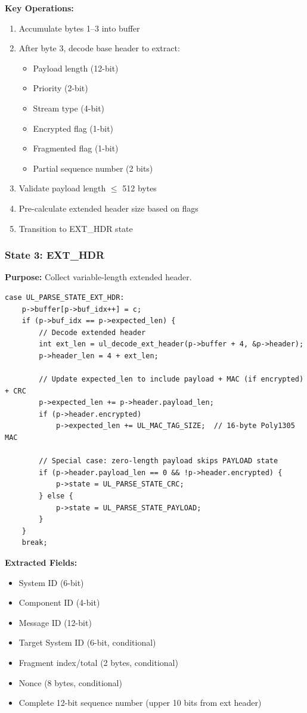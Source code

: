 \documentclass[11pt,a4paper]{article}
\begin{document}
\textbf{Key Operations:}
\begin{enumerate}[noitemsep]
    \item Accumulate bytes 1--3 into buffer
    \item After byte 3, decode base header to extract:
    \begin{itemize}
        \item Payload length (12-bit)
        \item Priority (2-bit)
        \item Stream type (4-bit)
        \item Encrypted flag (1-bit)
        \item Fragmented flag (1-bit)
        \item Partial sequence number (2 bits)
    \end{itemize}
    \item Validate payload length $\leq$ 512 bytes
    \item Pre-calculate extended header size based on flags
    \item Transition to EXT\_HDR state
\end{enumerate}

\subsubsection{State 3: EXT\_HDR}

\textbf{Purpose:} Collect variable-length extended header.

\begin{lstlisting}[caption={EXT\_HDR State Implementation}]
case UL_PARSE_STATE_EXT_HDR:
    p->buffer[p->buf_idx++] = c;
    if (p->buf_idx == p->expected_len) {
        // Decode extended header
        int ext_len = ul_decode_ext_header(p->buffer + 4, &p->header);
        p->header_len = 4 + ext_len;

        // Update expected_len to include payload + MAC (if encrypted) + CRC
        p->expected_len += p->header.payload_len;
        if (p->header.encrypted)
            p->expected_len += UL_MAC_TAG_SIZE;  // 16-byte Poly1305 MAC

        // Special case: zero-length payload skips PAYLOAD state
        if (p->header.payload_len == 0 && !p->header.encrypted) {
            p->state = UL_PARSE_STATE_CRC;
        } else {
            p->state = UL_PARSE_STATE_PAYLOAD;
        }
    }
    break;
\end{lstlisting}

\textbf{Extracted Fields:}
\begin{itemize}[noitemsep]
    \item System ID (6-bit)
    \item Component ID (4-bit)
    \item Message ID (12-bit)
    \item Target System ID (6-bit, conditional)
    \item Fragment index/total (2 bytes, conditional)
    \item Nonce (8 bytes, conditional)
    \item Complete 12-bit sequence number (upper 10 bits from ext header)
\end{itemize}
\end{document}
